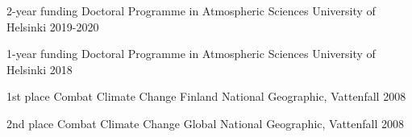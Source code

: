 



\begin{cvhonors}
	
  \cvhonor
    {2-year funding} %
    {Doctoral Programme in Atmospheric Sciences} %
    {University of Helsinki} %
    {2019-2020} %
	
  \cvhonor
    {1-year funding} %
    {Doctoral Programme in Atmospheric Sciences} %
    {University of Helsinki} %
    {2018} %

  \cvhonor
    {1st place} %
    {Combat Climate Change Finland} %
    {National Geographic, Vattenfall} %
    {2008} %

  \cvhonor
    {2nd place} %
    {Combat Climate Change Global} %
    {National Geographic, Vattenfall} %
    {2008} %


\end{cvhonors}




\begin{cvhonors}




\end{cvhonors}
